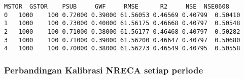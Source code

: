 \documentclass[11pt]{article}
\makeatletter
\newcommand{\boxspacing}{\kern\kvtcb@left@rule\kern\kvtcb@boxsep}
\newcommand{\prompt}[4]{
        {\ttfamily\llap{{\color{#2}[#3]:\hspace{3pt}#4}}\vspace{-\baselineskip}}
    }
\makeatother
\begin{document}
            \begin{tcolorbox}[breakable, size=fbox, boxrule=.5pt, pad at break*=1mm, opacityfill=0]
\prompt{Out}{outcolor}{ }{\boxspacing}
\begin{Verbatim}[commandchars=\\\{\}]
   MSTOR  GSTOR    PSUB     GWF     RMSE      R2     NSE  NSE0608
0   1000    100 0.72000 0.39000 61.56053 0.46569 0.40799  0.50410
1   1000    100 0.73000 0.40000 61.56175 0.46668 0.40797  0.50548
2   1000    100 0.71000 0.38000 61.56177 0.46468 0.40797  0.50282
3   1000    100 0.71000 0.39000 61.56200 0.46647 0.40797  0.50680
4   1000    100 0.70000 0.38000 61.56273 0.46549 0.40795  0.50558
\end{Verbatim}
\end{tcolorbox}
        
    \hypertarget{perbandingan-kalibrasi-nreca-setiap-periode}{%
\subsubsection{Perbandingan Kalibrasi NRECA setiap
periode}\label{perbandingan-kalibrasi-nreca-setiap-periode}}
\end{document}
